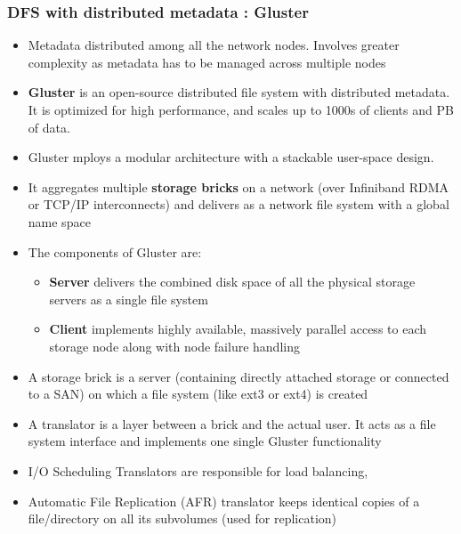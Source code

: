 \documentclass{article}
\begin{document}
\subsubsection{DFS with distributed metadata : Gluster}
\begin{itemize}
    \item Metadata distributed among all the network nodes. Involves greater complexity as metadata has to be managed across multiple nodes
    
    \item \textbf{Gluster} is an open-source distributed file system with distributed metadata. It is optimized for high performance, and scales up to 1000s of clients and PB of data. 
    
    \item Gluster mploys a modular architecture with a stackable user-space design. 
    
    \item It aggregates multiple \textbf{storage bricks} on a network (over Infiniband RDMA or TCP/IP interconnects) and delivers as a network file system with a global name space
    
    \item The components of Gluster are:
    \begin{itemize}
        \item \textbf{Server} delivers the combined disk space of all the physical storage servers as a single file system
        
        \item \textbf{Client} implements highly available, massively parallel access to each storage node along with node failure handling 
    \end{itemize}
    
    \item A storage brick is a server (containing directly attached storage or connected to a SAN) on which a file system (like ext3 or ext4) is created 
    
    \item A translator is a layer between a brick and the actual user. It acts as a file system interface and implements one single Gluster functionality
    
    \item I/O Scheduling Translators are responsible for load balancing,
    
    \item Automatic File Replication (AFR) translator keeps identical copies of a file/directory on all its subvolumes (used for replication)
\end{itemize}
\end{document}
